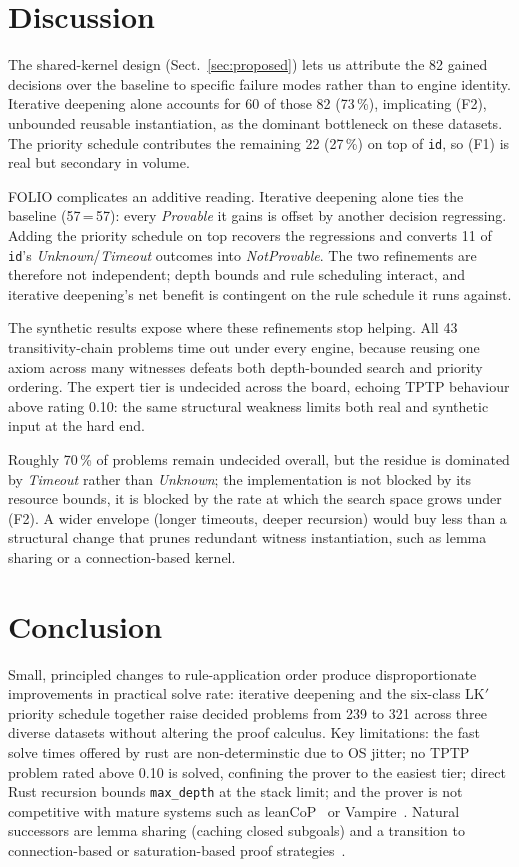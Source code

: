 \section{Discussion}

The shared-kernel design (Sect.~\ref{sec:proposed}) lets us attribute the
82 gained decisions over the baseline to specific failure modes rather
than to engine identity. Iterative deepening alone accounts for 60 of
those 82 (73\,\%), implicating (F2), unbounded reusable instantiation,
as the dominant bottleneck on these datasets. The priority schedule
contributes the remaining 22 (27\,\%) on top of \texttt{id}, so (F1) is
real but secondary in volume.

FOLIO complicates an additive reading. Iterative deepening alone ties
the baseline (57\,=\,57): every \textit{Provable} it gains is offset by
another decision regressing. Adding the priority schedule on top
recovers the regressions and converts 11 of \texttt{id}'s
\textit{Unknown}/\textit{Timeout} outcomes into \textit{NotProvable}.
The two refinements are therefore not independent; depth bounds and
rule scheduling interact, and iterative deepening's net benefit is
contingent on the rule schedule it runs against.

The synthetic results expose where these refinements stop helping. All
43 transitivity-chain problems time out under every engine, because
reusing one axiom across many witnesses defeats both depth-bounded
search and priority ordering. The expert tier is undecided across the
board, echoing TPTP behaviour above rating 0.10: the same structural
weakness limits both real and synthetic input at the hard end.

Roughly 70\,\% of problems remain undecided overall, but the residue is
dominated by \textit{Timeout} rather than \textit{Unknown}; the
implementation is not blocked by its resource bounds, it is blocked by
the rate at which the search space grows under (F2). A wider envelope
(longer timeouts, deeper recursion) would buy less than a structural
change that prunes redundant witness instantiation, such as lemma
sharing or a connection-based kernel.

\section{Conclusion}

Small, principled changes to rule-application order produce disproportionate
improvements in practical solve rate: iterative deepening and the six-class
LK$'$ priority schedule together raise decided problems from 239 to 321
across three diverse datasets without altering the proof calculus.
Key limitations: the fast solve times offered by rust are
non-determinstic due to OS jitter;
no TPTP problem rated above 0.10 is solved, confining the prover to the
easiest tier; direct Rust recursion bounds \texttt{max\_depth} at the
stack limit; and the prover is not competitive with mature systems such
as leanCoP~\cite{otten2003leancop} or Vampire~\cite{kovacs2013vampire}.
Natural successors are lemma sharing (caching closed subgoals) and a
transition to connection-based or saturation-based proof
strategies~\cite{kovacs2013vampire,schulz2002E}.


